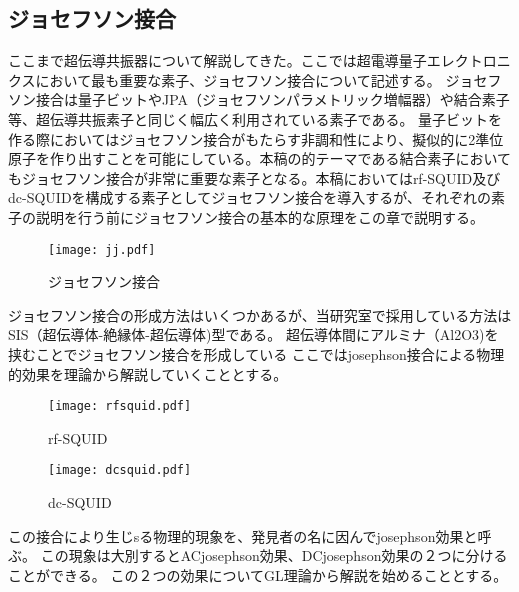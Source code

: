     \subsection{ジョセフソン接合}
            ここまで超伝導共振器について解説してきた。ここでは超電導量子エレクトロニクスにおいて最も重要な素子、ジョセフソン接合について記述する。
            ジョセフソン接合は量子ビットやJPA（ジョセフソンパラメトリック増幅器）や結合素子等、超伝導共振素子と同じく幅広く利用されている素子である。
            量子ビットを作る際においてはジョセフソン接合がもたらす非調和性により、擬似的に2準位原子を作り出すことを可能にしている。本稿の的テーマである結合素子においてもジョセフソン接合が非常に重要な素子となる。本稿においてはrf-SQUID及びdc-SQUIDを構成する素子としてジョセフソン接合を導入するが、それぞれの素子の説明を行う前にジョセフソン接合の基本的な原理をこの章で説明する。
            \begin{figure}[H]
                \centering
                \texttt{[image: jj.pdf]}
                \caption{ジョセフソン接合}
            \end{figure}
            ジョセフソン接合の形成方法はいくつかあるが、当研究室で採用している方法はSIS（超伝導体-絶縁体-超伝導体)型である。
            超伝導体間にアルミナ（Al2O3)を挟むことでジョセフソン接合を形成している
            ここではjosephson接合による物理的効果を理論から解説していくこととする。
            \begin{figure}[H]
                \begin{minipage}[t]{0.5\columnwidth}
                    \centering
                    \texttt{[image: rfsquid.pdf]}
                    \caption{rf-SQUID}
                \end{minipage}%
                \begin{minipage}[t]{0.5\columnwidth}
                    \centering
                    \texttt{[image: dcsquid.pdf]}
                    \caption{dc-SQUID}
                \end{minipage}
            \end{figure}

            この接合により生じsる物理的現象を、発見者の名に因んでjosephson効果と呼ぶ。
            この現象は大別するとACjosephson効果、DCjosephson効果の２つに分けることができる。
            この２つの効果についてGL理論から解説を始めることとする。
